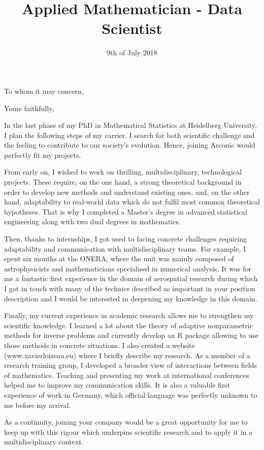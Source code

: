 \documentclass[11pt,a4paper,sans]{moderncv}        %
\title{Applied Mathematician - Data Scientist}                               %
\begin{document}
\date{9th of July 2018}
\opening{To whom it may concern,}
\closing{Yours faithfully,}

\makelettertitle

In the last phase of my PhD in Mathematical Statistics at Heidelberg University, I plan the following steps of my carrier. I search for both scientific challenge and the feeling to contribute to our society's evolution. Hence, joining Arconic would perfectly fit my projects.

\medskip

From early on, I wished to work on thrilling, multidisciplinary, technological projects. These require, on the one hand, a strong theoretical background in order to develop new methods and understand existing ones, and, on the other hand, adaptability to real-world data which do not fulfil most common theoretical hypotheses. That is why I completed a Master's degree in advanced statistical engineering along with two dual degrees in mathematics.

Then, thanks to internships, I got used to facing concrete challenges requiring adaptability and communication with multidisciplinary teams. For example, I spent six months at the ONERA, where the unit was mainly composed of astrophysicists and mathematicians specialised in numerical analysis. It was for me a fantastic first experience in the domain of aerospatial research during which I got in touch with many of the technics described as important in your position description and I would be interested in deepening my knowledge in this domain.

Finally, my current experience in academic research allows me to strengthen my scientific knowledge. I learned a lot about the theory of adaptive nonparametric methods for inverse problems and currently develop an R package allowing to use those methods in concrete situations. I also created a website (www.xavierloizeau.eu) where I briefly describe my research.
As a member of a research training group, I developed a broader view of interactions between fields of mathematics. Teaching and presenting my work at international conferences helped me to improve my communication skills. It is also a valuable first experience of work in Germany, which official language was perfectly unknown to me before my arrival.

As a continuity, joining your company would be a great opportunity for me to keep up with this rigour which underpins scientific research and to apply it in a multidisciplinary context.
\end{document}

